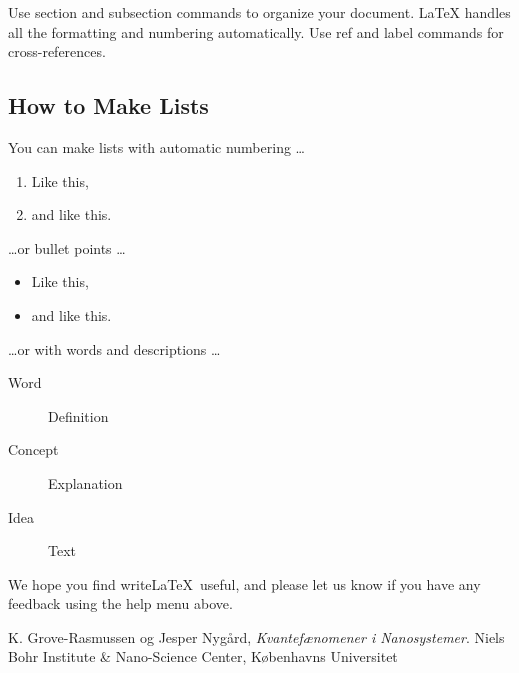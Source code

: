 \documentclass[a4paper]{article}
\begin{document}
      Use section and subsection commands to organize your document. \LaTeX{} handles all the formatting and numbering automatically. Use ref and label commands for cross-references.
      
      \subsection{How to Make Lists}
      
      You can make lists with automatic numbering \dots
      
      \begin{enumerate}
      \item Like this,
      \item and like this.
      \end{enumerate}
      \dots or bullet points \dots
      \begin{itemize}
      \item Like this,
      \item and like this.
      \end{itemize}
      \dots or with words and descriptions \dots
      \begin{description}
      \item[Word] Definition
      \item[Concept] Explanation
      \item[Idea] Text
      \end{description}
      
      We hope you find write\LaTeX\ useful, and please let us know if you have any feedback using the help menu above.
      
      \begin{thebibliography}{9}
        K. Grove-Rasmussen og Jesper Nygård,
        \emph{Kvantefænomener i Nanosystemer}.
        Niels Bohr Institute \& Nano-Science Center, Københavns Universitet
      
      \end{thebibliography}
      
\end{document}
